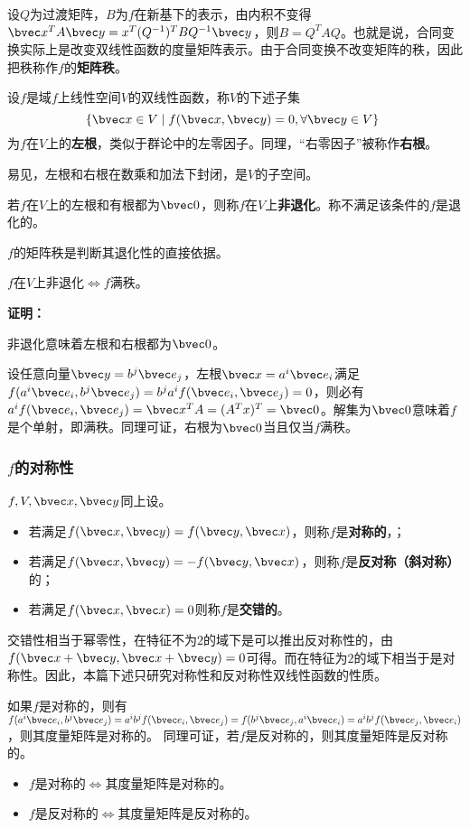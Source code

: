 设$Q$为过渡矩阵，$B$为$f$在新基下的表示，由内积不变得$\bvec x^TA\bvec y=x^T(Q^{-1})^TBQ^{-1}\bvec y$，则$B=Q^{T}AQ$。也就是说，合同变换实际上是改变双线性函数的度量矩阵表示。由于合同变换不改变矩阵的秩，因此把秩称作$f$的\textbf{矩阵秩}。
\begin{definition}{}
设$f$是域$f$上线性空间$V$的双线性函数，称$V$的下述子集
\begin{equation}
\{\bvec x \in V \mid f(\bvec x, \bvec y)=0, \forall \bvec y\in V\}~
\end{equation}
为$f$在$V$上的\textbf{左根}，类似于群论中的左零因子。同理，“右零因子”被称作\textbf{右根}。
\end{definition}
易见，左根和右根在数乘和加法下封闭，是$V$的子空间。
\begin{definition}{}
若$f$在$V$上的左根和有根都为${\bvec 0}$，则称$f$在$V$上\textbf{非退化}。称不满足该条件的$f$是退化的。
\end{definition}
$f$的矩阵秩是判断其退化性的直接依据。
\begin{theorem}{}
$f$在$V$上非退化$\Leftrightarrow f$满秩。
\end{theorem}
\textbf{证明：}

非退化意味着左根和右根都为$\bvec 0$。

设任意向量$\bvec y=b^j\bvec e_j$，左根$\bvec x=a^i\bvec e_i$满足$f(a^i\bvec e_i,b^j\bvec e_j)=b^ja^if(\bvec e_i,\bvec e_j)=0$，则必有$a^if(\bvec e_i,\bvec  e_j)=\bvec x^T A=(A^Tx)^T=\bvec 0$。解集为$\bvec 0$意味着$f$是个单射，即满秩。同理可证，右根为$\bvec 0$当且仅当$f$满秩。
\subsubsection{$f$的对称性}
\begin{definition}{}
$f,V,\bvec x,\bvec y$同上设。
\begin{itemize}
\item 若满足$f(\bvec x,\bvec y)=f(\bvec y,\bvec x)$，则称$f$是\textbf{对称的}，；
\item 若满足$f(\bvec x,\bvec y)=-f(\bvec y,\bvec x)$，则称$f$是\textbf{反对称（斜对称）}的；
\item 若满足$f(\bvec x,\bvec x)=0$则称$f$是\textbf{交错的}。
\end{itemize}
\end{definition}
交错性相当于幂零性，在特征不为$2$的域下是可以推出反对称性的，由$f(\bvec x+\bvec y,\bvec x+\bvec y)=0$可得。而在特征为$2$的域下相当于是对称性。因此，本篇下述只研究对称性和反对称性双线性函数的性质。

如果$f$是对称的，则有$f(a^i\bvec e_i,b^j\bvec e_j)=a^ib^jf(\bvec e_i,\bvec e_j)=f(b^j\bvec e_j,a^i\bvec e_i)=a^ib^jf(\bvec e_j,\bvec e_i)$，则其度量矩阵是对称的。
同理可证，若$f$是反对称的，则其度量矩阵是反对称的。
\begin{itemize}
\item $f$是对称的$\Leftrightarrow$其度量矩阵是对称的。
\item $f$是反对称的$\Leftrightarrow$其度量矩阵是反对称的。
\end{itemize}

